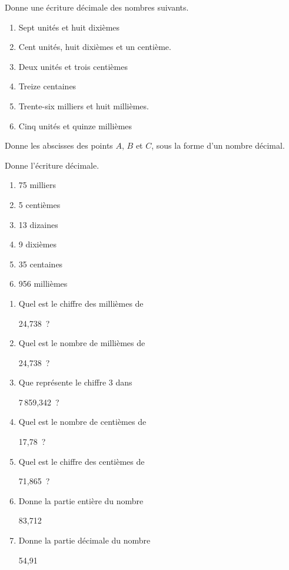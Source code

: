 \begin{exercice}
Donne une écriture décimale des nombres suivants.
\begin{enumerate}
 \item Sept unités et huit dixièmes \dotfill
 \item Cent unités, huit dixièmes et un centième.
 \dotfill
 \item Deux unités et trois centièmes
 
 \dotfill
 \item Treize centaines \dotfill
 \item Trente-six milliers et huit millièmes.
 
 \dotfill
 \item Cinq unités et quinze millièmes \dotfill
 \end{enumerate}
\end{exercice}


\begin{exercice}
Donne les abscisses des points $A$, $B$ et $C$, sous la forme d'un nombre décimal.
\end{exercice}

\begin{exercice}
Donne l'écriture décimale.
\begin{enumerate} %
 \item 75 milliers
 \item 5 centièmes
 \item 13 dizaines
 \item 9 dixièmes
 \item 35 centaines
 \item 956 millièmes
 \end{enumerate}
\end{exercice}


\begin{exercice}
\begin{enumerate}
 \item Quel est le chiffre des millièmes de 
 
24,738 ? \dotfill
 \item Quel est le nombre de millièmes de 
 
24,738 ? \dotfill
 \item Que représente le chiffre 3 dans 
 
7\,859,342 ? \dotfill
 \item Quel est le nombre de centièmes de 
 
17,78 ? \dotfill
 \item Quel est le chiffre des centièmes de 
 
71,865 ? \dotfill
 \item Donne la partie entière du nombre 
 
83,712 \dotfill
 \item Donne la partie décimale du nombre 
 
54,91 \dotfill
 \end{enumerate}
\end{exercice}


